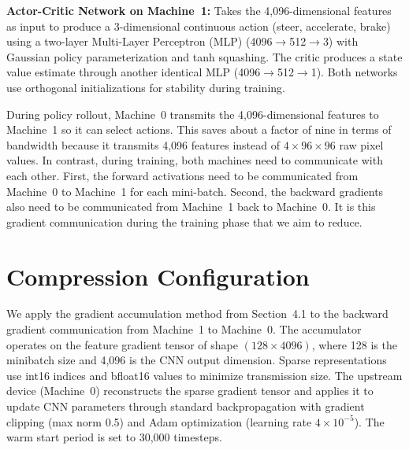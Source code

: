 \textbf{Actor-Critic Network on Machine~1:}
Takes the 4,096-dimensional features as input to produce a 3-dimensional continuous action (steer, accelerate, brake) using a two-layer Multi-Layer Perceptron (MLP) (4096$\rightarrow$512$\rightarrow$3) with Gaussian policy parameterization and tanh squashing. The critic produces a state value estimate through another identical MLP (4096$\rightarrow$512$\rightarrow$1). Both networks use orthogonal initializations for stability during training.

During policy rollout, Machine~0 transmits the 4,096-dimensional features to Machine~1 so it can select actions. This saves about a factor of nine in terms of bandwidth because it transmits 4,096 features instead of $4\times96\times96$ raw pixel values. In contrast, during training, both machines need to communicate with each other. First, the forward activations need to be communicated from Machine~0 to Machine~1 for each mini-batch. Second, the backward gradients also need to be communicated from Machine~1 back to Machine~0. It is this gradient communication during the training phase that we aim to reduce.

\section{Compression Configuration}

We apply the gradient accumulation method from Section~4.1 to the backward gradient communication from Machine~1 to Machine~0. The accumulator operates on the feature gradient tensor of shape $(128 \times 4096)$, where 128 is the minibatch size and 4,096 is the CNN output dimension. Sparse representations use int16 indices and bfloat16 values to minimize transmission size. The upstream device (Machine~0) reconstructs the sparse gradient tensor and applies it to update CNN parameters through standard backpropagation with gradient clipping (max norm 0.5) and Adam optimization (learning rate $4 \times 10^{-5}$). The warm start period is set to 30,000 timesteps.
